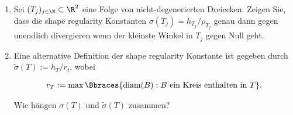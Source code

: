 
\begin{exercise}

\phantom{}

\begin{enumerate}[label = \textbf{\alph*)}]

  \item Sei $(T_j)_{j \in \N} \subset \R^2$ eine Folge von nicht-degenerierten Dreiecken.
  Zeigen Sie, dass die shape regularity Konstanten $\sigma(T_j) = h_{T_j} / \rho_{T_j}$ genau dann gegen unendlich divergieren wenn der kleinste Winkel in $T_j$ gegen Null geht.

  \item Eine alternative Definition der shape regularity Konstante ist gegeben durch $\tilde{\sigma}(T) := h_T / r_t$, wobei

  \begin{align*}
    r_T := \max
    \Bbraces
    {
      \text{diam}(B):
      B ~\text{ein Kreis enthalten in}~ T
    }.
  \end{align*}

  Wie hängen $\sigma(T)$ und $\tilde{\sigma}(T)$ zusammen?

\end{enumerate}

\end{exercise}


